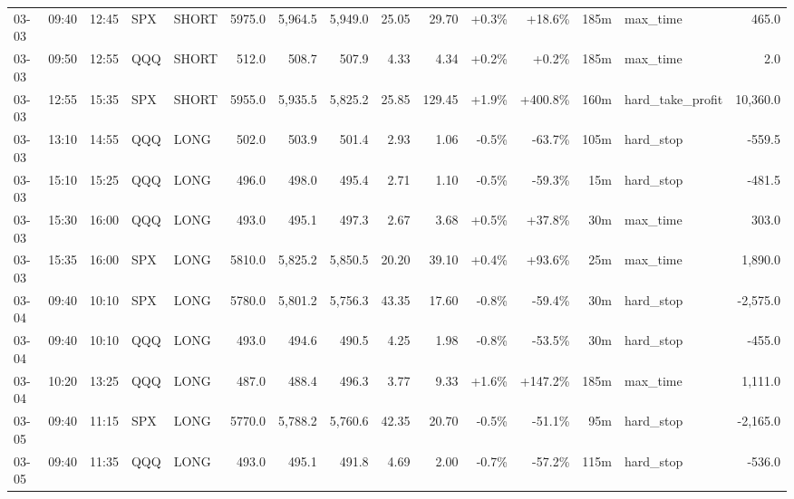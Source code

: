 \documentclass[11pt,a4paper,twoside]{article}
\begin{document}
\begin{landscape}
\begin{center}
\begin{longtable}{>{\color{txtmain}}l l l l l r r r r r r r r >{\color{txtmain}}l r}
03-03 & 09:40 & 12:45 & SPX & SHORT & 5975.0 & 5,964.5 & 5,949.0 & 25.05 & 29.70 & \textcolor{wingreen}{+0.3\%} & \textcolor{wingreen}{+18.6\%} & 185m & max\_time & \textcolor{wingreen}{465.0} \\
03-03 & 09:50 & 12:55 & QQQ & SHORT & 512.0 & 508.7 & 507.9 & 4.33 & 4.34 & \textcolor{wingreen}{+0.2\%} & \textcolor{wingreen}{+0.2\%} & 185m & max\_time & \textcolor{wingreen}{2.0} \\
03-03 & 12:55 & 15:35 & SPX & SHORT & 5955.0 & 5,935.5 & 5,825.2 & 25.85 & 129.45 & \textcolor{wingreen}{+1.9\%} & \textcolor{wingreen}{+400.8\%} & 160m & hard\_take\_profit & \textcolor{wingreen}{10,360.0} \\
03-03 & 13:10 & 14:55 & QQQ & LONG & 502.0 & 503.9 & 501.4 & 2.93 & 1.06 & \textcolor{lossred}{-0.5\%} & \textcolor{lossred}{-63.7\%} & 105m & hard\_stop & \textcolor{lossred}{-559.5} \\
03-03 & 15:10 & 15:25 & QQQ & LONG & 496.0 & 498.0 & 495.4 & 2.71 & 1.10 & \textcolor{lossred}{-0.5\%} & \textcolor{lossred}{-59.3\%} & 15m & hard\_stop & \textcolor{lossred}{-481.5} \\
03-03 & 15:30 & 16:00 & QQQ & LONG & 493.0 & 495.1 & 497.3 & 2.67 & 3.68 & \textcolor{wingreen}{+0.5\%} & \textcolor{wingreen}{+37.8\%} & 30m & max\_time & \textcolor{wingreen}{303.0} \\
03-03 & 15:35 & 16:00 & SPX & LONG & 5810.0 & 5,825.2 & 5,850.5 & 20.20 & 39.10 & \textcolor{wingreen}{+0.4\%} & \textcolor{wingreen}{+93.6\%} & 25m & max\_time & \textcolor{wingreen}{1,890.0} \\
03-04 & 09:40 & 10:10 & SPX & LONG & 5780.0 & 5,801.2 & 5,756.3 & 43.35 & 17.60 & \textcolor{lossred}{-0.8\%} & \textcolor{lossred}{-59.4\%} & 30m & hard\_stop & \textcolor{lossred}{-2,575.0} \\
03-04 & 09:40 & 10:10 & QQQ & LONG & 493.0 & 494.6 & 490.5 & 4.25 & 1.98 & \textcolor{lossred}{-0.8\%} & \textcolor{lossred}{-53.5\%} & 30m & hard\_stop & \textcolor{lossred}{-455.0} \\
03-04 & 10:20 & 13:25 & QQQ & LONG & 487.0 & 488.4 & 496.3 & 3.77 & 9.33 & \textcolor{wingreen}{+1.6\%} & \textcolor{wingreen}{+147.2\%} & 185m & max\_time & \textcolor{wingreen}{1,111.0} \\
03-05 & 09:40 & 11:15 & SPX & LONG & 5770.0 & 5,788.2 & 5,760.6 & 42.35 & 20.70 & \textcolor{lossred}{-0.5\%} & \textcolor{lossred}{-51.1\%} & 95m & hard\_stop & \textcolor{lossred}{-2,165.0} \\
03-05 & 09:40 & 11:35 & QQQ & LONG & 493.0 & 495.1 & 491.8 & 4.69 & 2.00 & \textcolor{lossred}{-0.7\%} & \textcolor{lossred}{-57.2\%} & 115m & hard\_stop & \textcolor{lossred}{-536.0} \\

\end{longtable}
\end{center}
\end{landscape}
\end{document}
